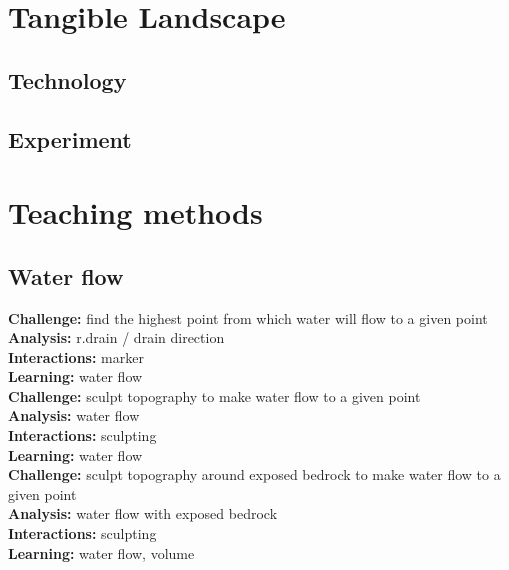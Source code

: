 \documentclass[final,3p,times,twocolumn]{elsarticle}
\begin{document}
\section{Tangible Landscape}\label{tangible_landscape}
\subsection{Technology}

\subsection{Experiment}
\cite{Harmon2016c}

\section{Teaching methods}\label{methods}



\subsection{Water flow}
\noindent
\textbf{Challenge:} find the highest point from which water will flow to a given point \\
\textbf{Analysis:} r.drain / drain direction \\
\textbf{Interactions:} marker  \\
\textbf{Learning:} water flow \\

\noindent
\textbf{Challenge:} sculpt topography to make water flow to a given point \\
\textbf{Analysis:} water flow \\
\textbf{Interactions:} sculpting  \\
\textbf{Learning:} water flow \\

\noindent
\textbf{Challenge:} sculpt topography around exposed bedrock to make water flow to a given point \\
\textbf{Analysis:} water flow with exposed bedrock \\
\textbf{Interactions:} sculpting  \\
\textbf{Learning:} water flow, volume \\
\end{document}
